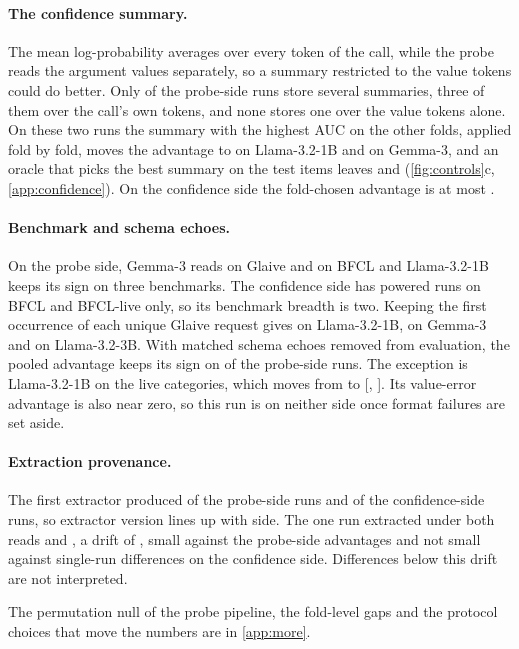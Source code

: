 \paragraph{The confidence summary.}
The mean log-probability averages over every token of the call, while the probe reads the argument values separately, so a summary restricted to the value tokens could do better. Only \nMultiSummaryInternals{} of the \nInternalsRuns{} probe-side runs store several summaries, three of them over the call's own tokens, and none stores one over the value tokens alone. On these two runs the summary with the highest AUC on the other folds, applied fold by fold, moves the advantage to \gapBestLlamaOneBBfcl{} on Llama-3.2-1B and \gapBestGemmaBfcl{} on Gemma-3, and an oracle that picks the best summary on the test items leaves \gapOracleLlamaOneBBfcl{} and \gapOracleGemmaBfcl{} (\cref{fig:controls}c, \cref{app:confidence}). On the confidence side the fold-chosen advantage is at most \gapBestConfidenceMax{}.

\paragraph{Benchmark and schema echoes.}
On the probe side, Gemma-3 reads \GapGemmaGlaive{} on Glaive and \GapGemmaBfcl{} on BFCL and Llama-3.2-1B keeps its sign on three benchmarks. The confidence side has powered runs on BFCL and BFCL-live only, so its benchmark breadth is two. Keeping the first occurrence of each unique Glaive request gives \gdGapLlamaOneBGlaive{} on Llama-3.2-1B, \gdGapGemmaGlaive{} on Gemma-3 and \gdGapLlamaThreeBGlaive{} on Llama-3.2-3B. With matched schema echoes removed from evaluation, the pooled advantage keeps its sign on \nNoEchoHolds{} of the \nInternalsRuns{} probe-side runs. The exception is Llama-3.2-1B on the live categories, which moves from \GapLlamaOneBLive{} to \GapNoEchoLlamaOneBLive{} [\GapNoEchoLoLlamaOneBLive{}, \GapNoEchoHiLlamaOneBLive{}]. Its value-error advantage is also near zero, so this run is on neither side once format failures are set aside.

\paragraph{Extraction provenance.}
The first extractor produced \nFirstExtractInternals{} of the \nInternalsRuns{} probe-side runs and \nFirstExtractConfidence{} of the \nConfidenceRuns{} confidence-side runs, so extractor version lines up with side. The one run extracted under both reads \replGapStale{} and \replGapClean{}, a drift of \replGapDelta{}, small against the probe-side advantages and not small against single-run differences on the confidence side. Differences below this drift are not interpreted.

The permutation null of the probe pipeline, the fold-level gaps and the protocol choices that move the numbers are in \cref{app:more}.
